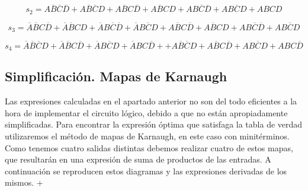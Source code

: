 \begin{equation}\label{s2_mini}
    s_{2} = A\overline{B}\overline{C}\overline{D} +A\overline{B}\overline{C}D+A\overline{B}C\overline{D}+A\overline{B}CD+AB\overline{C}\overline{D}+AB\overline{C}D+ABCD
\end{equation}

\begin{equation}\label{s3_mini}
    s_{3} = \overline{A}\overline{B}C\overline{D}+\overline{A}\overline{B}CD+\overline{A}B\overline{C}\overline{D}+\overline{A}B\overline{C}D+A\overline{B}C\overline{D}+A\overline{B}CD+AB\overline{C}\overline{D}+AB\overline{C}D
\end{equation}

\begin{equation}\label{s4_mini}
    s_{4} = \overline{A}\overline{B}\overline{C}D+\overline{A}\overline{B}C\overline{D}+\overline{A}B\overline{C}D+\overline{A}BC\overline{D}++A\overline{B}\overline{C}D+A\overline{B}C\overline{D}+AB\overline{C}D+ABC\overline{D}
\end{equation}

\subsection{Simplificación. Mapas de Karnaugh}

Las expresiones calculadas en el apartado anterior no son del todo eficientes a la hora de implementar el circuito lógico, debido a que no están apropiadamente simplificadas. Para encontrar la expresión óptima que satisfaga la tabla de verdad utilizaremos el método de mapas de Karnaugh, en este caso con minitérminos. Como tenemos cuatro salidas distintas debemos realizar cuatro de estos mapas, que resultarán en una expresión de suma de productos de las entradas. A continuación se reproducen estos diagramas y las expresiones derivadas de los mismos.
+
    \begin{Karnaugh}\label{Karnaugh_s1}
    \end{Karnaugh}

\begin{Karnaugh}\label{Karnaugh_s2}
    \end{Karnaugh}
    
\begin{Karnaugh}\label{Karnaugh_s3}
    \end{Karnaugh}

